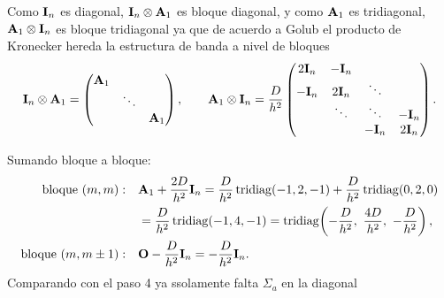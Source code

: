 Como $\mathbf{I}_n$ es diagonal, $\mathbf{I}_n\otimes\mathbf{A}_1$ es bloque diagonal, y como $\mathbf{A}_1$ es
tridiagonal, $\mathbf{A}_1\otimes\mathbf{I}_n$ es bloque tridiagonal ya que de acuerdo a Golub el producto de
Kronecker hereda la estructura de banda a nivel de bloques 
\[
\mathbf{I}_n\otimes\mathbf{A}_1 =
\begin{pmatrix}
	\mathbf{A}_1 &        &           \\
	& \ddots &           \\
	&        & \mathbf{A}_1
\end{pmatrix},
\qquad
\mathbf{A}_1\otimes\mathbf{I}_n = \frac{D}{h^2}
\begin{pmatrix}
	2\mathbf{I}_n & -\mathbf{I}_n &         &            \\
	-\mathbf{I}_n  & 2\mathbf{I}_n & \ddots  &            \\
	& \ddots     & \ddots  & -\mathbf{I}_n \\
	&            & -\mathbf{I}_n & 2\mathbf{I}_n
\end{pmatrix}.
\]

Sumando bloque a bloque:
\begin{align*}
	\text{bloque } (m, m):&\quad \mat{A}_1 + \frac{2D}{h^2}\mat{I}_n
	= \frac{D}{h^2}\tridiag(-1, 2, -1) + \frac{D}{h^2}\tridiag(0, 2, 0)\\
	&\quad= \frac{D}{h^2}\tridiag(-1, 4, -1)
	= \tridiag\!\left(-\frac{D}{h^2},\ \frac{4D}{h^2},\ -\frac{D}{h^2}\right),\\
	\text{bloque } (m, m\pm1):&\quad \mat{O} - \frac{D}{h^2}\mat{I}_n = -\frac{D}{h^2}\mat{I}_n .
\end{align*}
Comparando con el paso 4 ya ssolamente falta $\Sigma_a$ en la diagonal

